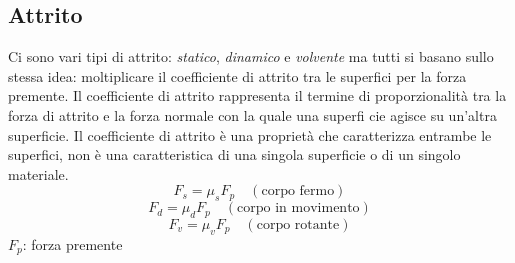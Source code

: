 \subsection{Attrito}
Ci sono vari tipi di attrito: \emph{statico}, \emph{dinamico} e \emph{volvente} ma tutti si basano
sullo stessa idea: moltiplicare il coefficiente di attrito tra le superfici per la forza premente.
Il coefficiente di attrito rappresenta il termine di proporzionalità tra la forza di attrito e la 
forza normale con la quale una superfi cie agisce su un’altra superficie. Il coefficiente di 
attrito è una proprietà che caratterizza entrambe le superfici, non è una caratteristica di una 
singola superficie o di un singolo materiale.
\begin{equation*}
  F_s = \mu_sF_p\quad (\text{corpo fermo})
\end{equation*}
\begin{equation*}
  F_d = \mu_dF_p\quad (\text{corpo in movimento})
\end{equation*}
\begin{equation*}
  F_v = \mu_vF_p\quad (\text{corpo rotante})
\end{equation*}
$F_p$: forza premente

